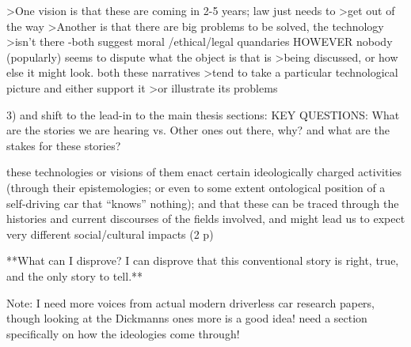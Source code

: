 >One vision is that these are coming in 2-5 years; law just needs to
>get out of the way
>Another is that there are big problems to be solved, the technology
>isn't there
-both suggest moral /ethical/legal quandaries
HOWEVER nobody (popularly) seems to dispute what the object is that is
>being discussed, or how else it might look. both these narratives
>tend to take a particular technological picture and either support it
>or illustrate its problems



3) and shift to the lead-in to the main thesis sections: 
KEY QUESTIONS: What are the stories we are hearing vs. Other ones out
there, why? and what are the stakes for these stories?

these technologies or visions of them enact certain ideologically charged
activities (through their epistemologies; or even to some extent
ontological position of a self-driving car that ``knows'' nothing);
and that these can be traced through the histories and current
discourses of the fields involved, and might lead us to expect very
different social/cultural impacts (2 p)

**What can I disprove?
I can disprove that this conventional story is right, true, and the
only story to tell.**

Note: I need more voices from actual modern driverless car research
papers, though looking at the Dickmanns ones more is a good idea! need
a section specifically on how the ideologies come through!

